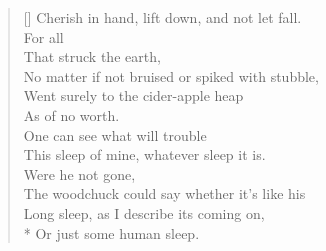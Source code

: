 \documentclass[MAIN]{subfiles}
\begin{document}
\begin{verse}[\versewidth]
Cherish in hand, lift down, and not let fall.\\ 
For all\\
That struck the earth,\\
No matter if not bruised or spiked with stubble,\\
Went surely to the cider-apple heap\\
As of no worth.\\
One can see what will trouble\\
This sleep of mine, whatever sleep it is.\\
Were he not gone,\\
The woodchuck could say whether it's like his\\
Long sleep, as I describe its coming on,\\*
Or just some human sleep.
\end{verse}
\end{document}
